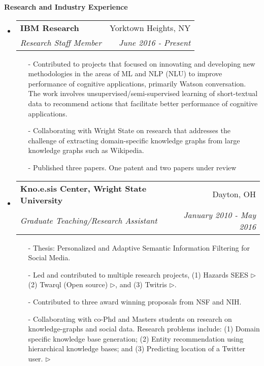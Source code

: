 \documentclass[letterpaper,9pt]{article}
\makeatletter
\newcommand{\resheading}[1]{{\large \colorbox{mygrey}{\begin{minipage}{\textwidth}{\textbf{#1 \vphantom{p\^{E}}}}\end{minipage}}}}
\newcommand{\ressubheading}[4]{
\begin{tabular*}{7.0in}{l@{\extracolsep{\fill}}r}
		\textbf{#1} & #2 \\
		\textit{#3} & \textit{#4} \\
\end{tabular*}\vspace{-6pt}}
\makeatother
\begin{document}
\resheading{Research and Industry Experience}
\begin{itemize}
\item
	\ressubheading{IBM Research}{Yorktown Heights, NY}{Research Staff Member}{June 2016 - Present}

\begin{itemize}

\item[-] Contributed to projects that focused on innovating and developing new methodologies in the areas of ML and NLP (NLU) to improve performance of cognitive applications, primarily Watson conversation. The work involves unsupervised/semi-supervised learning of short-textual data to recommend actions that facilitate better performance of cognitive applications. 

\item[-] \justify Collaborating with Wright State on research that addresses the challenge of extracting domain-specific knowledge graphs from large knowledge graphs such as Wikipedia. 

\item[-] \justify Published three papers. One patent and two papers under review
\end{itemize}


\item
	\ressubheading{Kno.e.sis Center, Wright State University}{Dayton, OH}{Graduate Teaching/Research Assistant}{January 2010 - May 2016}

\begin{itemize}

\item[-] Thesis: Personalized and Adaptive Semantic Information Filtering for Social Media. 
	
\item[-] Led and contributed to multiple research projects, (1) Hazards SEES \href{http://wiki.knoesis.org/index.php/Social_and_Physical_Sensing_
Enabled_Decision_Support}{$\triangleright$} (2) Twarql (Open source) \href{http://wiki.knoesis.org/index.php/Twarql}{$\triangleright$}, and (3) Twitris \href{http://twitris.knoesis.org}{$\triangleright$}. 

\item[-] \justify Contributed to three award winning proposals from NSF and NIH.

\item[-] \justify Collaborating with co-Phd and Masters students on research on  knowledge-graphs and social data. Research problems include: (1) Domain specific knowledge base generation; (2) Entity recommendation using hierarchical knowledge bases; and (3) Predicting location of a Twitter user.  \href{http://knoesis.org/library/resource.php?id=2039}{$\triangleright$}  


\end{itemize}
\end{itemize}
\end{document}
